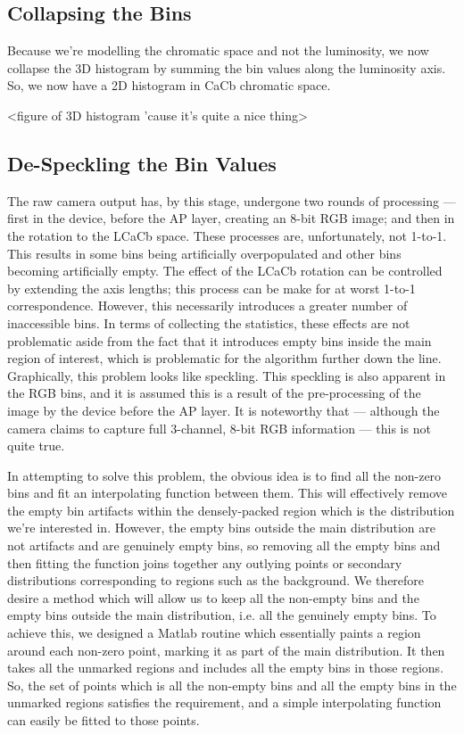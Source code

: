 \subsection{Collapsing the Bins}\label{sec:CollapsingTheBins}
Because we're modelling the chromatic space and not the luminosity, we now collapse the 3D histogram by summing the bin values along the luminosity axis. So, we now have a 2D histogram in CaCb chromatic space.

<figure of 3D histogram 'cause it's quite a nice thing>


\subsection{De-Speckling the Bin Values}\label{sec:DeSpeckle}
The raw camera output has, by this stage, undergone two rounds of processing --- first in the device, before the AP layer, creating an 8-bit RGB image; and then in the rotation to the LCaCb space. These processes are, unfortunately, not 1-to-1. This results in some bins being artificially overpopulated and other bins becoming artificially empty. The effect of the LCaCb rotation can be controlled by extending the axis lengths; this process can be make for at worst 1-to-1 correspondence. However, this necessarily introduces a greater number of inaccessible bins. In terms of collecting the statistics, these effects are not problematic aside from the fact that it introduces empty bins inside the main region of interest, which is problematic for the algorithm further down the line. Graphically, this problem looks like speckling. This speckling is also apparent in the RGB bins, and it is assumed this is a result of the pre-processing of the image by the device before the AP layer. It is noteworthy that --- although the camera claims to capture full 3-channel, 8-bit RGB information --- this is not quite true. 

In attempting to solve this problem, the obvious idea is to find all the non-zero bins and fit an interpolating function between them. This will effectively remove the empty bin artifacts within the densely-packed region which is the distribution we're interested in. However, the empty bins outside the main distribution are not artifacts and are genuinely empty bins, so removing all the empty bins and then fitting the function joins together any outlying points or secondary distributions corresponding to regions such as the background. We therefore desire a method which will allow us to keep all the non-empty bins and the empty bins outside the main distribution, i.e. all the genuinely empty bins. To achieve this, we designed a Matlab routine which essentially paints a region around each non-zero point, marking it as part of the main distribution. It then takes all the unmarked regions and includes all the empty bins in those regions. So, the set of points which is all the non-empty bins and all the empty bins in the unmarked regions satisfies the requirement, and a simple interpolating function can easily be fitted to those points.

